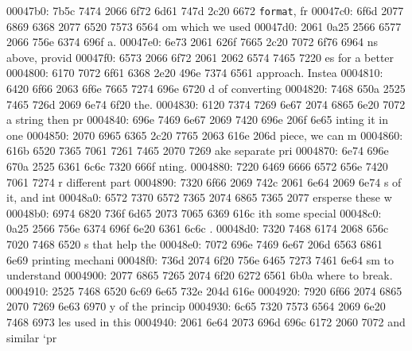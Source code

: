 \begin{bo
00010e0: 7865 647d 5c62 6567 696e 7b76 6572 6261  xed}
\begin{verba
00010f0: 7469 6d7d 0a20 2023 7479 7065 2074 6572  tim}
\begin{
0001c40: 7665 7262 6174 696d 7d0a 2020 236c 6574  verbatim}
\begin{boxe
00027a0: 647d 5c62 6567 696e 7b76 6572 6261 7469  d}
\begin{verbati
00027b0: 6d7d 0a20 2023 6c65 7420 696e 6669 7865  m}
\begin{v
0002c60: 6572 6261 7469 6d7d 0a20 2023 6c65 7420  erbatim}
\begin{
0002dc0: 7665 7262 6174 696d 7d0a 2020 236c 6574  verbatim}
\begin{boxed
0002f30: 7d5c 6265 6769 6e7b 7665 7262 6174 696d  }
\begin{verbatim
0002f40: 7d0a 2020 236c 6574 2068 6428 683a 3a74  }
\begin{v
0003e60: 6572 6261 7469 6d7d 0a20 2023 236f 7065  erbatim}
\begin{boxed
00042b0: 7d5c 6265 6769 6e7b 7665 7262 6174 696d  }
\begin{verbatim
00042c0: 7d0a 2020 2328 782c 7429 3b3b 0a20 202d  }
\begin{boxed}
00047b0: 7b5c 7474 2066 6f72 6d61 747d 2c20 6672  {\tt format}, fr
00047c0: 6f6d 2077 6869 6368 2077 6520 7573 6564  om which we used
00047d0: 2061 0a25 2566 6577 2066 756e 6374 696f   a.%
00047e0: 6e73 2061 626f 7665 2c20 7072 6f76 6964  ns above, provid
00047f0: 6573 2066 6f72 2061 2062 6574 7465 7220  es for a better 
0004800: 6170 7072 6f61 6368 2e20 496e 7374 6561  approach. Instea
0004810: 6420 6f66 2063 6f6e 7665 7274 696e 6720  d of converting 
0004820: 7468 650a 2525 7465 726d 2069 6e74 6f20  the.%
0004830: 6120 7374 7269 6e67 2074 6865 6e20 7072  a string then pr
0004840: 696e 7469 6e67 2069 7420 696e 206f 6e65  inting it in one
0004850: 2070 6965 6365 2c20 7765 2063 616e 206d   piece, we can m
0004860: 616b 6520 7365 7061 7261 7465 2070 7269  ake separate pri
0004870: 6e74 696e 670a 2525 6361 6c6c 7320 666f  nting.%
0004880: 7220 6469 6666 6572 656e 7420 7061 7274  r different part
0004890: 7320 6f66 2069 742c 2061 6e64 2069 6e74  s of it, and int
00048a0: 6572 7370 6572 7365 2074 6865 7365 2077  ersperse these w
00048b0: 6974 6820 736f 6d65 2073 7065 6369 616c  ith some special
00048c0: 0a25 2566 756e 6374 696f 6e20 6361 6c6c  .%
00048d0: 7320 7468 6174 2068 656c 7020 7468 6520  s that help the 
00048e0: 7072 696e 7469 6e67 206d 6563 6861 6e69  printing mechani
00048f0: 736d 2074 6f20 756e 6465 7273 7461 6e64  sm to understand
0004900: 2077 6865 7265 2074 6f20 6272 6561 6b0a   where to break.
0004910: 2525 7468 6520 6c69 6e65 732e 204d 616e  %
0004920: 7920 6f66 2074 6865 2070 7269 6e63 6970  y of the princip
0004930: 6c65 7320 7573 6564 2069 6e20 7468 6973  les used in this
0004940: 2061 6e64 2073 696d 696c 6172 2060 7072   and similar `pr

\end{boxed}
\end{verbatim
00042c0: 7d0a 2020 2328 782c 7429 3b3b 0a20 202d  }
\end{boxed
00042b0: 7d5c 6265 6769 6e7b 7665 7262 6174 696d  }
\end{v
0003e60: 6572 6261 7469 6d7d 0a20 2023 236f 7065  erbatim}
\end{verbatim
0002f40: 7d0a 2020 236c 6574 2068 6428 683a 3a74  }
\end{boxed
0002f30: 7d5c 6265 6769 6e7b 7665 7262 6174 696d  }
\end{
0002dc0: 7665 7262 6174 696d 7d0a 2020 236c 6574  verbatim}
\end{v
0002c60: 6572 6261 7469 6d7d 0a20 2023 6c65 7420  erbatim}
\end{verbati
00027b0: 6d7d 0a20 2023 6c65 7420 696e 6669 7865  m}
\end{boxe
00027a0: 647d 5c62 6567 696e 7b76 6572 6261 7469  d}
\end{
0001c40: 7665 7262 6174 696d 7d0a 2020 236c 6574  verbatim}
\end{verba
00010f0: 7469 6d7d 0a20 2023 7479 7065 2074 6572  tim}
\end{bo
00010e0: 7865 647d 5c62 6567 696e 7b76 6572 6261  xed}
